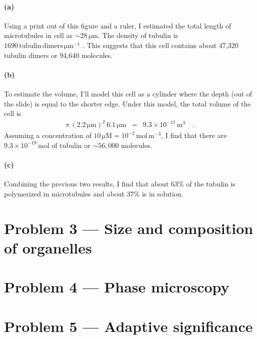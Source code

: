 \documentclass[11pt]{article}
\newcommand{\unit}[1]{\ensuremath{\,\mathrm{#1}}}
\begin{document}
\paragraph{(a)}
Using a print out of this figure and a ruler, I estimated the total length of
microtubules in cell as $\sim28\unit{\mu m}$.
The density of tubulin is $1690 \unit{tubulin\,dimers\,\mu m^{-1}}$
\cite{mtiv,amos}.
This suggests that this cell contains about 47,320 tubulin dimers or 94,640
molecules.

\paragraph{(b)}
To estimate the volume, I'll model this cell as a cylinder where the depth
(out of the slide) is equal to the shorter edge.
Under this model, the total volume of the cell is
\begin{eqnarray}
\pi \, (2.2\unit{\mu m})^2 \, 6.1\unit{\mu m} &=& 9.3\times 10^{-17} \unit{m^3}
\quad.
\end{eqnarray}
Assuming a concentration of $10\unit{\mu M} = 10^{-2}\unit{mol\,m^{-3}}$, I
find that there are $9.3\times10^{-19}\unit{mol}$ of tubulin or $\sim56,000$
molecules.

\paragraph{(c)}
Combining the previous two results, I find that about 63\% of the tubulin is
polymerized in microtubules and about 37\% is in solution.


\section{Problem 3 --- Size and composition of organelles}


\section{Problem 4 --- Phase microscopy}


\section{Problem 5 --- Adaptive significance}

\cite{gerhart, alon, lynch}

{}

\end{document}

